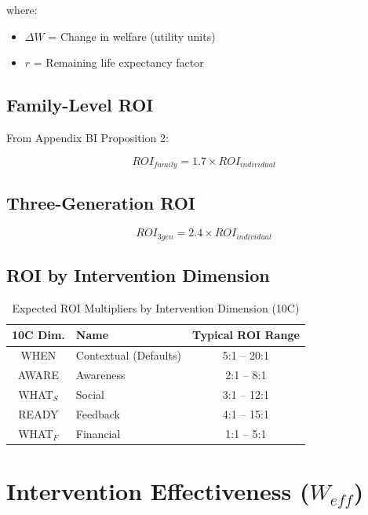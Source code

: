where:
\begin{itemize}
\item $\Delta W$ = Change in welfare (utility units)
\item $r$ = Remaining life expectancy factor
\end{itemize}

\subsection{Family-Level ROI}

From Appendix BI Proposition 2:

\begin{equation}
\boxed{
ROI_{family} = 1.7 \times ROI_{individual}
}
\label{eq:roi-family}
\end{equation}

\subsection{Three-Generation ROI}

\begin{equation}
ROI_{3gen} = 2.4 \times ROI_{individual}
\label{eq:roi-3gen}
\end{equation}

\subsection{ROI by Intervention Dimension}

\begin{table}[htbp]
\centering
\caption{Expected ROI Multipliers by Intervention Dimension (10C)}
\label{tab:roi-types}
\renewcommand{\arraystretch}{1.3}
\begin{tabular}{@{}clc@{}}
\toprule
\textbf{10C Dim.} & \textbf{Name} & \textbf{Typical ROI Range} \\
\midrule
WHEN & Contextual (Defaults) & 5:1 -- 20:1 \\
AWARE & Awareness & 2:1 -- 8:1 \\
WHAT$_S$ & Social & 3:1 -- 12:1 \\
READY & Feedback & 4:1 -- 15:1 \\
WHAT$_F$ & Financial & 1:1 -- 5:1 \\
\bottomrule
\end{tabular}
\end{table}


\section{Intervention Effectiveness ($W_{eff}$)}
\label{sec:calc-weff}

